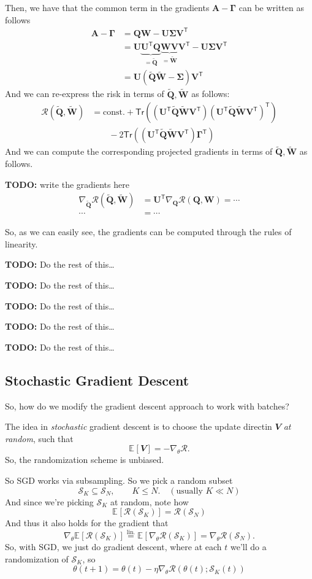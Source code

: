 \documentclass[a2paper,8pt]{extarticle}
\newcommand{\cR}{\mathcal{R}}
\newcommand{\cS}{\mathcal{S}}
\newcommand{\Tr}[1]{\mathsf{Tr}\left( #1 \right)}
\newcommand{\Exp}[2][]{{\mathbb{E}_{#1}}\left[ #2
\right]}
\newcommand{\rvV}{\mathbfit{V}}
\newcommand*{\T}{\mathsf{T}}
\newcommand{\mat}[1]{\mathbf{#1}}
\newcommand{\MA}{\mat{A}}
\newcommand{\MQ}{\mat{Q}}
\newcommand{\MU}{\mat{U}}
\newcommand{\MV}{\mat{V}}
\newcommand{\MW}{\mat{W}}
\newcommand{\MGamma}{\mat{\Gamma}}
\newcommand{\MSigma}{\mat{\Sigma}}
\newcommand{\todo}[1]{\textbf{TODO:} #1}
\newcommand{\todo}[1]{%
}
\begin{document}
\begin{landscape}
\begin{multicols*}{7}
Then, we have that the common term in the gradients $\MA-\MGamma$ can be written
as follows
\begin{align*}
\MA-\MGamma
&=\MQ\MW-\MU\MSigma\MV^\T
\\
&=\MU\underbrace{\MU^\T\MQ}_{=\widetilde{\MQ}}
\underbrace{\MW\MV}_{=\widetilde{\MW}}\MV^\T-\MU\MSigma\MV^\T
\\
&=\MU(\widetilde{\MQ}\widetilde{\MW}-\MSigma)\MV^\T
\end{align*}
And we can re-express the risk in terms of $\widetilde{\MQ},\widetilde{\MW}$ as
follows:
\begin{align*}
\cR(\widetilde{\MQ},\widetilde{\MW})
&=
\text{const.}
+
\Tr{(\MU^\T\widetilde{\MQ}\widetilde{\MW}\MV^\T)
(\MU^\T\widetilde{\MQ}\widetilde{\MW}\MV^\T)^\T}
\\
&\qquad-2\Tr{(\MU^\T\widetilde{\MQ}\widetilde{\MW}\MV^\T)\MGamma^\T}
\end{align*}
And we can compute the corresponding projected gradients in terms of
$\widetilde{\MQ},\widetilde{\MW}$ as follows.

\todo{write the gradients here}
\begin{align*}
\nabla_{\widetilde{\MQ}}\cR(\widetilde{\MQ},\widetilde{\MW})
&=\MU^\T\nabla_{\MQ}\cR(\MQ,\MW)=\cdots
\\
\cdots &=\cdots
\end{align*}

So, as we can easily see, the gradients can be computed through the rules of
linearity.

\todo{Do the rest of this\ldots}

\todo{Do the rest of this\ldots}

\todo{Do the rest of this\ldots}

\todo{Do the rest of this\ldots}

\todo{Do the rest of this\ldots}

\subsection{Stochastic Gradient Descent}

So, how do we modify the gradient descent approach to work with batches?

The idea in \emph{stochastic} gradient descent is to choose the update directin
$\rvV$ \emph{at random}, such that
\[
\Exp{\rvV}=-\nabla_\theta\cR.
\]
So, the randomization scheme is unbiased.

So SGD works via subsampling. So we pick a random subset
\[
\cS_K\subseteq\cS_N,\qquad K\leq N.
\quad
(\text{usually }K\ll N)
\]
And since we're picking $\cS_K$ at random, note how
\[
\Exp{\cR(\cS_K)}=\cR(\cS_N)
\]
And thus it also holds for the gradient that
\[
\nabla_{\theta}\Exp{\cR(\cS_K)}
\stackrel{\text{lin.}}{=}
\Exp{\nabla_{\theta}\cR(\cS_K)}
=\nabla_{\theta}\cR(\cS_N).
\]
So, with SGD, we just do gradient descent, where at each $t$ we'll do a
randomization of $\cS_K$, so
\[
\theta(t+1)=
\theta(t)
-
\eta\nabla_\theta\cR(\theta(t);\cS_{K}(t))
\]


\end{multicols*}
\end{landscape}
\end{document}
